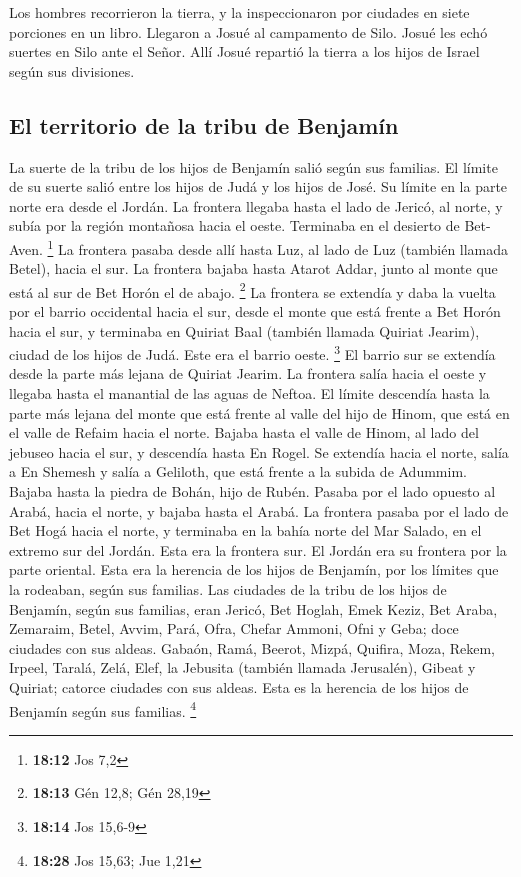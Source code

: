 Los hombres recorrieron la tierra, y la inspeccionaron
por ciudades en siete porciones en un libro. Llegaron a Josué al
campamento de Silo.  Josué les echó suertes en Silo ante
el Señor. Allí Josué repartió la tierra a los hijos de Israel según sus
divisiones.

\hypertarget{el-territorio-de-la-tribu-de-benjamuxedn}{%
\subsection{El territorio de la tribu de
Benjamín}\label{el-territorio-de-la-tribu-de-benjamuxedn}}

 La suerte de la tribu de los hijos de Benjamín salió
según sus familias. El límite de su suerte salió entre los hijos de Judá
y los hijos de José.  Su límite en la parte norte era
desde el Jordán. La frontera llegaba hasta el lado de Jericó, al norte,
y subía por la región montañosa hacia el oeste. Terminaba en el desierto
de Bet-Aven. \footnote{\textbf{18:12} Jos 7,2}  La
frontera pasaba desde allí hasta Luz, al lado de Luz (también llamada
Betel), hacia el sur. La frontera bajaba hasta Atarot Addar, junto al
monte que está al sur de Bet Horón el de abajo. \footnote{\textbf{18:13}
  Gén 12,8; Gén 28,19}  La frontera se extendía y daba la
vuelta por el barrio occidental hacia el sur, desde el monte que está
frente a Bet Horón hacia el sur, y terminaba en Quiriat Baal (también
llamada Quiriat Jearim), ciudad de los hijos de Judá. Este era el barrio
oeste. \footnote{\textbf{18:14} Jos 15,6-9}  El barrio
sur se extendía desde la parte más lejana de Quiriat Jearim. La frontera
salía hacia el oeste y llegaba hasta el manantial de las aguas de
Neftoa.  El límite descendía hasta la parte más lejana
del monte que está frente al valle del hijo de Hinom, que está en el
valle de Refaim hacia el norte. Bajaba hasta el valle de Hinom, al lado
del jebuseo hacia el sur, y descendía hasta En Rogel.  Se
extendía hacia el norte, salía a En Shemesh y salía a Geliloth, que está
frente a la subida de Adummim. Bajaba hasta la piedra de Bohán, hijo de
Rubén.  Pasaba por el lado opuesto al Arabá, hacia el
norte, y bajaba hasta el Arabá.  La frontera pasaba por
el lado de Bet Hogá hacia el norte, y terminaba en la bahía norte del
Mar Salado, en el extremo sur del Jordán. Esta era la frontera sur.
 El Jordán era su frontera por la parte oriental. Esta
era la herencia de los hijos de Benjamín, por los límites que la
rodeaban, según sus familias.  Las ciudades de la tribu
de los hijos de Benjamín, según sus familias, eran Jericó, Bet Hoglah,
Emek Keziz,  Bet Araba, Zemaraim, Betel, 
Avvim, Pará, Ofra,  Chefar Ammoni, Ofni y Geba; doce
ciudades con sus aldeas.  Gabaón, Ramá, Beerot,
 Mizpá, Quifira, Moza,  Rekem, Irpeel,
Taralá,  Zelá, Elef, la Jebusita (también llamada
Jerusalén), Gibeat y Quiriat; catorce ciudades con sus aldeas. Esta es
la herencia de los hijos de Benjamín según sus familias. \footnote{\textbf{18:28}
  Jos 15,63; Jue 1,21}

